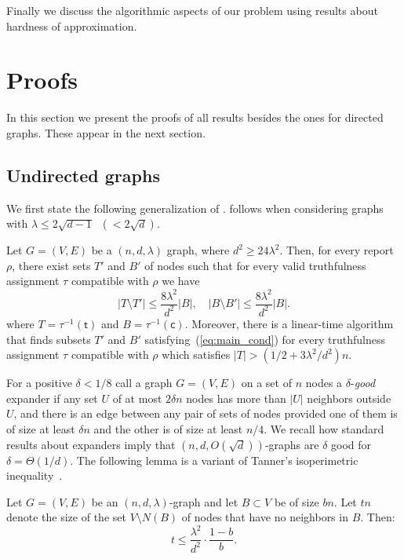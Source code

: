 \documentclass{toc}
\begin{document}
Finally we discuss the algorithmic aspects of our problem 
using results about hardness of approximation.


\section{Proofs} \label{sec:proofs} 

In this section we present the proofs of all results besides the ones
for directed graphs. These appear in the next section.

\subsection{Undirected graphs} 
\label{subsec:undirected}
We first state the following generalization of . 
 follows when considering graphs 
with $\lambda \leq 2 \sqrt{d-1}  \;\;(< 2 \sqrt d)$. 
\begin{theorem}
\label{t21}

Let $G = (V,E)$ be a $(n,d,\lambda)$ graph, where
$d^2 \geq 24 \lambda^2$.  
Then, for every report
$\rho$, there exist sets $T'$ and $B'$ of nodes
such that for every valid truthfulness assignment
$\tau$ compatible with $\rho$ we have
\begin{equation}
\label{eq:main_cond}
|T \setminus T'| \leq \frac{8 \lambda^2}{d^2} |B| , \quad 
|B \setminus B'| \leq  \frac{8 \lambda^2}{d^2} |B|.
\end{equation}
where $T = \tau^{-1}(\mathsf{t})$ and $B =  \tau^{-1}(\mathsf{c})$.
%
Moreover, there is a linear-time
algorithm that finds subsets $T'$ and
$B'$ satisfying~(\ref{eq:main_cond})
for every
truthfulness assignment $\tau$
compatible with $\rho$ which
satisfies
$|T|>(1/2+3\lambda^2/d^2)n$.
%
\end{theorem}

For a positive $\delta<1/8$
call a graph $G=(V,E)$ on a set of $n$ nodes a
$\delta$-\emph{good}
expander if any set $U$ of at most $2 \delta n$ nodes has 
more than $|U|$ neighbors outside $U$, and there is an edge between
any pair of sets of nodes provided one of them is of
size at least $\delta n$ and the other is of size at least 
$n/4$.
We recall how standard results about expanders 
%
imply that $(n,d,O(\sqrt{d}))$-graphs are $\delta$ good 
for $\delta = \Theta(1/d)$. 
%
%
%
The following lemma is a variant of Tanner's isoperimetric
inequality~\cite{tanner}.
\begin{lemma}
 \label{cor:expand}
Let $G=(V,E)$ be an $(n,d,\lambda)$-graph and let $B \subset V$ be of size 
$b n$. Let $t n$ denote the size of the set $V \setminus N(B)$
of nodes that have no neighbors in $B$. Then:
\begin{equation}  \label{eq:nonneighbors}
t \leq \frac{\lambda^2}{d^2}\cdot\frac{1-b}{b}.
\end{equation}
\end{lemma}
\end{document}

